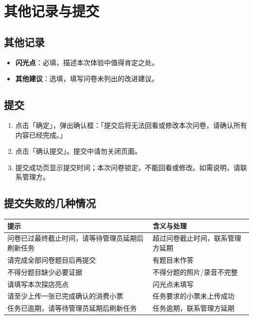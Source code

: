 \documentclass[12pt,a4paper,fontset=none]{ctexart}
\begin{document}
\section{其他记录与提交}

\subsection{其他记录}
\begin{itemize}
\item \textbf{闪光点}：必填，描述本次体验中值得肯定之处。
\item \textbf{其他建议}：选填，填写问卷未列出的改进建议。
\end{itemize}

\subsection{提交}
\begin{enumerate}
\item 点击「确定」，弹出确认框：「提交后将无法回看或修改本次问卷，请确认所有内容已经完成。」
\item 点击「确认提交」。提交中请勿关闭页面。
\item 提交成功页显示提交时间；本次问卷锁定，不能回看或修改。如需说明，请联系管理方。
\end{enumerate}


\subsection{提交失败的几种情况}

\begin{center}
\begin{tabular}{p{5.4cm}p{8cm}}
\toprule
提示 & 含义与处理 \\
\midrule
问卷已过最终截止时间，请等待管理员延期后刷新任务 & 超过问卷截止时间，联系管理方延期 \\
请完成全部问卷题目后再提交 & 有题目未作答 \\
不得分题目缺少必要证据 & 不得分题的照片/录音不完整 \\
请填写本次探店亮点 & 闪光点未填写 \\
请至少上传一张已完成确认的消费小票 & 任务要求的小票未上传成功 \\
任务已逾期，请等待管理员延期后刷新任务 & 任务逾期，联系管理方延期 \\
\bottomrule
\end{tabular}
\end{center}
\end{document}

